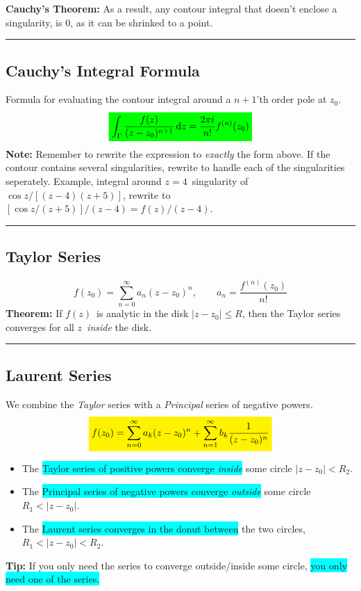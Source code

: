 \documentclass[10pt,a4paper]{article}
\newcommand{\holine}{\rule{286pt}{1pt}}
\newcommand{\yl}[1]{\colorbox{yellow}{$\displaystyle #1$}}
\newcommand{\gr}[1]{\colorbox{green}{$\displaystyle #1$}}
\newcommand{\bll}{\colorbox{cyan}}
\begin{document}
\begin{multicols}{2}
\textbf{Cauchy's Theorem:} As a result, any contour integral that doesn't enclose a singularity, is 0, as it can be shrinked to a point.



\holine
\subsection*{Cauchy's Integral Formula}
Formula for evaluating the contour integral around a $n+1$'th order pole at $z_0$.
\[\gr{
    \int_\Gamma \frac{f(z)}{(z-z_0)^{n+1}}\dd{z} = \frac{2\pi i}{n!}f^{(n)}(z_0)
}\]
\textbf{Note:} Remember to rewrite the expression to \textit{exactly} the form above. If the contour contains several singularities, rewrite to handle each of the singularities seperately. Example, integral around $z=4$ singularity of $\cos{z}/[(z-4)(z+5)]$, rewrite to $[\cos{z}/(z+5)]/(z-4) = f(z)/(z-4)$.



\holine
\subsection*{Taylor Series}
\[
    f(z_0) = \sum_{n=0}^\infty a_n(z-z_0)^n, \quad\quad a_n = \frac{f^{(n)}(z_0)}{n!}
\]
\textbf{Theorem:} If $f(z)$ is analytic in the disk $|z-z_0| \leq R$, then the Taylor series converges for all $z$ \textit{inside} the disk.



\holine
\subsection*{Laurent Series}
We combine the \textit{Taylor} series with a \textit{Principal} series of negative powers.
\[
\yl{
    f(z_0) = \sum_{n=0}^\infty a_k(z-z_0)^n + \sum_{n=1}^\infty b_k\frac{1}{(z-z_0)^n}
}
\]
\begin{itemize}
    \item The \bll{Taylor series of positive powers converge \textit{inside}} some circle $|z-z_0| < R_2$.
    \item The \bll{Principal series of negative powers converge \textit{outside}} some circle $R_1 < |z-z_0|$.
    \item The \bll{Laurent series converges in the donut between} the two circles, $R_1 < |z-z_0| < R_2$.
\end{itemize}
\textbf{Tip:} If you only need the series to converge outside/inside some circle, \bll{you only need one of the series.}


\end{multicols}
\end{document}
